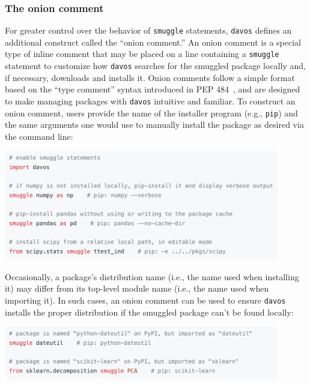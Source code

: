 \documentclass[preprint,12pt,a4paper]{elsarticle}
\begin{document}
\subsubsection{The onion comment}\label{subsec:onion}
For greater control over the behavior of \texttt{smuggle} statements, \texttt{davos} defines an additional construct called the ``onion comment.'' An onion comment is a special type of inline comment that may be placed on a line containing a \texttt{smuggle} statement to customize how \texttt{davos} searches for the smuggled package locally and, if necessary, downloads and installs it. Onion comments follow a simple format based on the ``type comment'' syntax introduced in PEP 484~\cite{vanREtal14}, and are designed to make managing packages with \texttt{davos} intuitive and familiar. To construct an onion comment, users provide the name of the installer program (e.g., \texttt{pip}) and the same arguments one would use to manually install the package as desired via the command line:
\begin{center}
\includegraphics[width=0.9\textwidth]{figs/snippet1}
\end{center}
Occasionally, a package's distribution name (i.e., the name used when installing it) may differ from its top-level module name (i.e., the name used when importing it). In such cases, an onion comment can be used to ensure \texttt{davos} installs the proper distribution if the smuggled package can't be found locally:
\begin{center}
\includegraphics[width=0.9\textwidth]{figs/snippet2}
\end{center}
\end{document}
